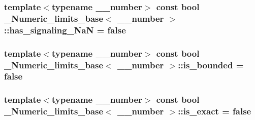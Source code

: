 \subsubsection[{has\+\_\+signaling\+\_\+\+Na\+N}]{\setlength{\rightskip}{0pt plus 5cm}template$<$typename \+\_\+\+\_\+number$>$ const {\bf bool} {\bf \+\_\+\+Numeric\+\_\+limits\+\_\+base}$<$ \+\_\+\+\_\+number $>$\+::has\+\_\+signaling\+\_\+\+Na\+N = {\bf false}\hspace{0.3cm}{\ttfamily [static]}}\label{class__Numeric__limits__base_a48cb53c83c521d6c3afb3d6c6990bb00}
\hypertarget{class__Numeric__limits__base_a67438daf1037ca71c464eec39a06ea89}{}
\subsubsection[{is\+\_\+bounded}]{\setlength{\rightskip}{0pt plus 5cm}template$<$typename \+\_\+\+\_\+number$>$ const {\bf bool} {\bf \+\_\+\+Numeric\+\_\+limits\+\_\+base}$<$ \+\_\+\+\_\+number $>$\+::is\+\_\+bounded = {\bf false}\hspace{0.3cm}{\ttfamily [static]}}\label{class__Numeric__limits__base_a67438daf1037ca71c464eec39a06ea89}
\hypertarget{class__Numeric__limits__base_a4c09679f8c1d2e4603494f9450059fa9}{}
\subsubsection[{is\+\_\+exact}]{\setlength{\rightskip}{0pt plus 5cm}template$<$typename \+\_\+\+\_\+number$>$ const {\bf bool} {\bf \+\_\+\+Numeric\+\_\+limits\+\_\+base}$<$ \+\_\+\+\_\+number $>$\+::is\+\_\+exact = {\bf false}\hspace{0.3cm}{\ttfamily [static]}}\label{class__Numeric__limits__base_a4c09679f8c1d2e4603494f9450059fa9}
\hypertarget{class__Numeric__limits__base_a840e40576b7fffa76b4f5776f8a7a4f1}{}
